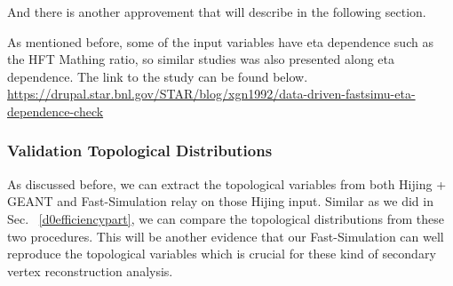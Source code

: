 And there is another approvement that will describe in the following section.

As mentioned before, some of the input variables have eta dependence such as the HFT Mathing ratio, so similar studies was also presented along eta dependence. The link to the study can be found below.
\url{https://drupal.star.bnl.gov/STAR/blog/xgn1992/data-driven-fastsimu-eta-dependence-check}
\subsubsection{Validation Topological Distributions}
\label{validationTopo}

As discussed before, we can extract the topological variables from both Hijing + GEANT and Fast-Simulation relay on those Hijing input. Similar as we did in Sec. ~\ref{d0efficiencypart}, we can compare the topological distributions from these two procedures. This will be another evidence that our Fast-Simulation can well reproduce the topological variables which is crucial for these kind of secondary vertex reconstruction analysis.

